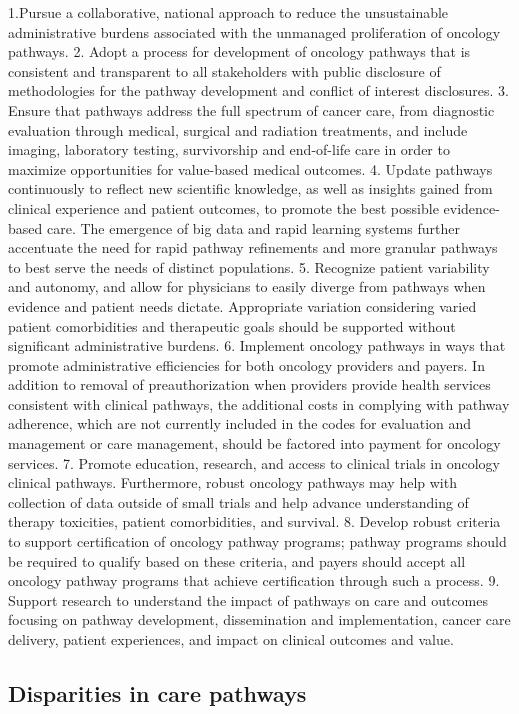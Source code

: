 1.Pursue a collaborative, national approach to reduce the unsustainable
administrative burdens associated with the unmanaged proliferation of oncology
pathways.
2. Adopt a process for development of oncology pathways that is consistent and
transparent to all stakeholders with public disclosure of methodologies for the
pathway development and conflict of interest disclosures.
3. Ensure that pathways
address the full spectrum of cancer care, from diagnostic evaluation through
medical, surgical and radiation treatments, and include imaging, laboratory
testing, survivorship and end-of-life care in order to maximize opportunities
for value-based medical outcomes.
4. Update pathways continuously to reflect new
scientific knowledge, as well as insights gained from clinical experience and
patient outcomes, to promote the best possible evidence-based care. The
emergence of big data and rapid learning systems further accentuate the need for
rapid pathway refinements and more granular pathways to best serve the needs of
distinct populations.
5. Recognize patient variability and autonomy, and allow for
physicians to easily diverge from pathways when evidence and patient needs
dictate. Appropriate variation considering varied patient comorbidities and
therapeutic goals should be supported without significant administrative
burdens.
6. Implement oncology pathways in ways that promote administrative
efficiencies for both oncology providers and payers. In addition to removal of
preauthorization when providers provide health services consistent with clinical
pathways, the additional costs in complying with pathway adherence, which are
not currently included in the codes for evaluation and management or care
management, should be factored into payment for oncology services.
7. Promote education, research, and access to clinical trials in oncology clinical
pathways. Furthermore, robust oncology pathways may help with collection of data
outside of small trials and help advance understanding of therapy toxicities,
patient comorbidities, and survival.
8. Develop robust criteria to support
certification of oncology pathway programs; pathway programs should be required
to qualify based on these criteria, and payers should accept all oncology
pathway programs that achieve certification through such a process.
9. Support
research to understand the impact of pathways on care and outcomes focusing on
pathway development, dissemination and implementation, cancer care delivery,
patient experiences, and impact on clinical outcomes and value.

\subsection{Disparities in care pathways}

